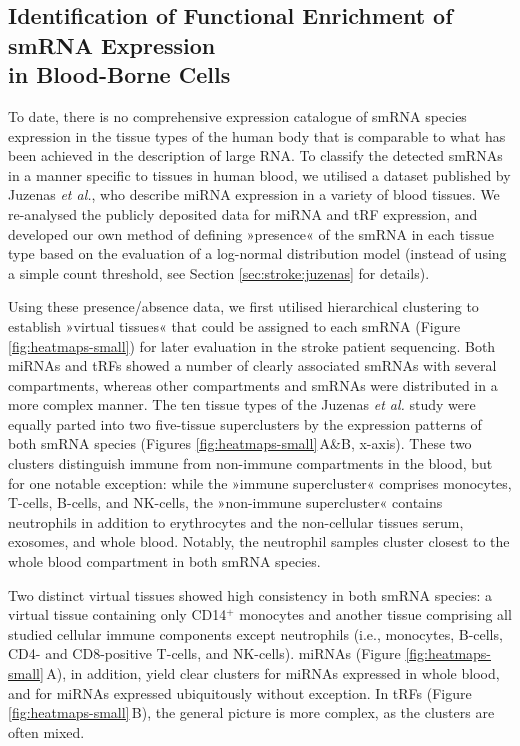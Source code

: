 \subsection{Identification of Functional Enrichment of smRNA Expression\\ in Blood-Borne Cells}
To date, there is no comprehensive expression catalogue of smRNA species expression in the tissue types of the human body that is comparable to what has been achieved in the description of large RNA. To classify the detected smRNAs in a manner specific to tissues in human blood, we utilised a dataset published by Juzenas \emph{et al.},\cite{Juzenas2017} who describe miRNA expression in a variety of blood tissues. We re-analysed the publicly deposited data for miRNA and tRF expression, and developed our own method of defining »presence« of the smRNA in each tissue type based on the evaluation of a log-normal distribution model (instead of using a simple count threshold, see Section \ref{sec:stroke:juzenas} for details). 

Using these presence/absence data, we first utilised hierarchical clustering to establish »virtual tissues« that could be assigned to each smRNA (Figure \ref{fig:heatmaps-small}) for later evaluation in the stroke patient sequencing. Both miRNAs and tRFs showed a number of clearly associated smRNAs with several compartments, whereas other compartments and smRNAs were distributed in a more complex manner. The ten tissue types of the Juzenas \emph{et al.}\cite{Juzenas2017} study were equally parted into two five-tissue superclusters by the expression patterns of both smRNA species (Figures \ref{fig:heatmaps-small}\,A\&B, x-axis). These two clusters distinguish immune from non-immune compartments in the blood, but for one notable exception: while the »immune supercluster« comprises monocytes, T-cells, B-cells, and NK-cells, the »non-immune supercluster« contains neutrophils in addition to erythrocytes and the non-cellular tissues serum, exosomes, and whole blood. Notably, the neutrophil samples cluster closest to the whole blood compartment in both smRNA species.

Two distinct virtual tissues showed high consistency in both smRNA species: a virtual tissue containing only CD14$^+$ monocytes and another tissue comprising all studied cellular immune components except neutrophils (i.e., monocytes, B-cells, CD4- and CD8-positive T-cells, and NK-cells). miRNAs (Figure \ref{fig:heatmaps-small}\,A), in addition, yield clear clusters for miRNAs expressed in whole blood, and for miRNAs expressed ubiquitously without exception. In tRFs (Figure \ref{fig:heatmaps-small}\,B), the general picture is more complex, as the clusters are often mixed.

